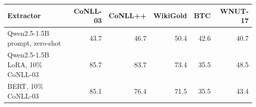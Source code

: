 \begingroup\small\setlength{\tabcolsep}{3pt}
\begin{tabular*}{\linewidth}{@{\extracolsep{\fill}}lrrrrr@{}}
\toprule
Extractor & CoNLL-03 & CoNLL++ & WikiGold & BTC & WNUT-17 \\
\midrule
Qwen2.5-1.5B prompt, zero-shot & 43.7 & 46.7 & 50.4 & 42.6 & 40.7 \\
Qwen2.5-1.5B LoRA, 10\% CoNLL-03 & 85.7 & 83.7 & 73.4 & 35.5 & 48.5 \\
BERT, 10\% CoNLL-03 & 85.1 & 76.4 & 71.5 & 35.5 & 43.4 \\
\bottomrule
\end{tabular*}
\endgroup
